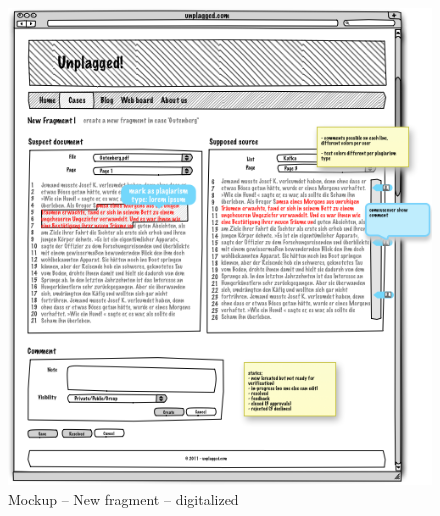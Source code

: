 \begin{appendix}
\begin{figure}[tbp]
  \centering
    \includegraphics[width=\textwidth]{mockups/3_new_fragment.png}
  \caption{Mockup – New fragment – digitalized }
  \label{fig:3newFragmentMockup}
\end{figure}


\end{appendix}
